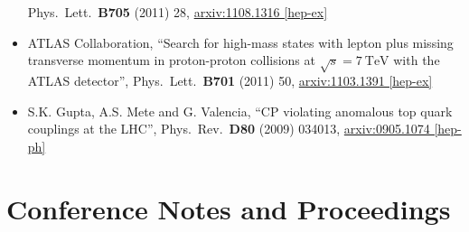 \documentclass[a4paper,10pt]{article}
\begin{document}
\begin{itemize}
	Phys.\ Lett.\ {\bf B705} (2011) 28,
	\href{http://arxiv.org/abs/arXiv:1108.1316}{arxiv:1108.1316 [hep-ex]}
	\item ATLAS Collaboration,
	``Search for high-mass states with lepton plus missing transverse momentum in proton-proton collisions at $\sqrt{s} = 7\ \mathrm{TeV}$ with the ATLAS detector'',
	Phys.\ Lett.\ {\bf B701} (2011) 50,
	\href{http://arxiv.org/abs/1103.1391}{arxiv:1103.1391 [hep-ex]}
	\item S.K. Gupta, A.S. Mete and G. Valencia,
	``CP violating anomalous top quark couplings at the LHC'',
	Phys.\ Rev.\ {\bf D80} (2009) 034013,
	\href{http://arxiv.org/abs/0905.1074}{arxiv:0905.1074 [hep-ph]}
\end{itemize}


\vspace{3mm}
\section{Conference Notes and Proceedings}
\end{document}
